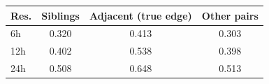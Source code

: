 \begin{tabular}{@{}lccc@{}}
\toprule
Res. & Siblings & Adjacent (true edge) & Other pairs \\
\midrule
6h & 0.320 & 0.413 & 0.303 \\
12h & 0.402 & 0.538 & 0.398 \\
24h & 0.508 & 0.648 & 0.513 \\
\bottomrule
\end{tabular}
